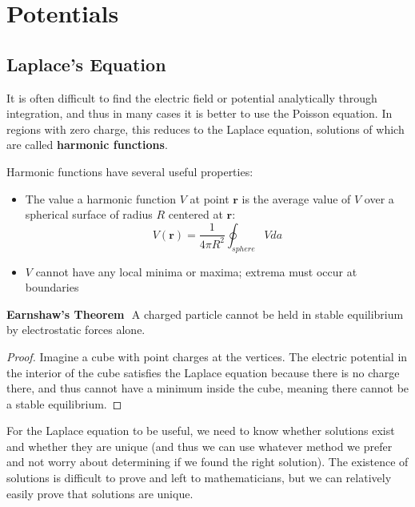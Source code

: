 \documentclass{article}
\begin{document}
\newpage
\section{Potentials}
\subsection{Laplace's Equation}
It is often difficult to find the electric field or potential analytically through integration, and thus in many cases it is 
better to use the Poisson equation. In regions with zero charge, this reduces to the Laplace equation, solutions of which are called \textbf{harmonic functions}.

Harmonic functions have several useful properties:
\begin{itemize}
    \item The value a harmonic function \(V\) at point \(\mathbf{r} \) is the average value of \(V\) over a spherical surface of radius \(R\) centered at \(\mathbf{r}\):
        \[
            V(\mathbf{r} )=\frac{1}{4 \pi R^2}\oint_{sphere} V da
        \]
    \item \(V\) cannot have any local minima or maxima; extrema must occur at boundaries 
\end{itemize}

\begin{theorem}{\textbf{Earnshaw's Theorem}}
    $ $ \newline
    A charged particle cannot be held in stable equilibrium by electrostatic forces alone.
\end{theorem}
\begin{proof}
    Imagine a cube with point charges at the vertices. The electric potential in the interior of the cube satisfies 
    the Laplace equation because there is no charge there, and thus cannot have a minimum inside the cube, meaning there cannot be a stable 
    equilibrium.
\end{proof}

For the Laplace equation to be useful, we need to know whether solutions exist and whether they are unique (and thus we can use whatever method we prefer 
and not worry about determining if we found the right solution). The existence of solutions is difficult to prove and left to mathematicians, but we can relatively 
easily prove that solutions are unique.
\end{document}
